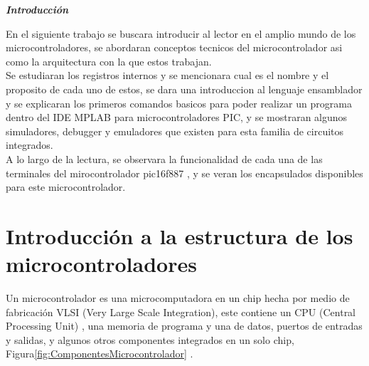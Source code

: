 \documentclass[12pt,a4paper]{article}
\begin{document}
\begin{titlepage}
\end{titlepage} 

   \newpage
   
   
   \begin{center}
    \textbf{\textit{Introducción}}
   \end{center}
   En el siguiente trabajo se buscara introducir al lector en el amplio mundo de los microcontroladores, se abordaran conceptos tecnicos del microcontrolador asi como la arquitectura con la que estos trabajan.\\
   Se estudiaran los registros internos y se mencionara cual es el nombre y el proposito de cada uno de estos, se dara una introduccion al lenguaje ensamblador y se explicaran los primeros comandos basicos para poder realizar un programa dentro del IDE MPLAB para microcontroladores PIC, y se mostraran algunos simuladores, debugger y emuladores que existen para esta familia de circuitos integrados.\\
   A lo largo de la lectura, se observara la funcionalidad de cada una de las terminales del mirocontrolador pic16f887 , y se veran los encapsulados disponibles para este microcontrolador.
   
   \newpage
   \tableofcontents
   \newpage
   \listoffigures
   \newpage
   \listoftables
   \newpage
   \renewcommand{\figurename}{Figura 1.}
    \renewcommand{\tablename}{Tabla 1.}
   \setcounter{table}{0}
   \section{Introducción a la estructura de los microcontroladores}
   Un microcontrolador es una microcomputadora en un chip hecha por medio de fabricación VLSI (Very Large Scale Integration), este contiene un CPU (Central Processing Unit) , una memoria de programa y una de datos, puertos de entradas y salidas, y algunos otros componentes integrados en un solo chip, Figura\ref{fig:ComponentesMicrocontrolador}  \cite{Ravi}.
   
\end{document}
